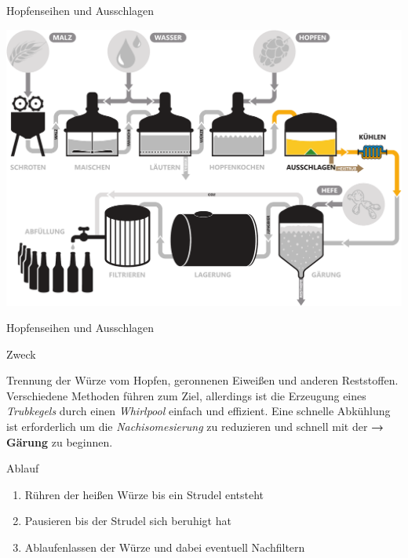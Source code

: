\documentclass[9pt, ngerman]{beamer}
\newcommand{\forward}[1]{\textbf{→\,#1}}
\begin{document}
\begin{frame}{Hopfenseihen und Ausschlagen}
  \begin{center}
    \vspace{0.5cm}
    \includegraphics[width=\textwidth]{pdfs/prozess-ausschlagen.pdf}
  \end{center}
\end{frame}
\begin{frame}{Hopfenseihen und Ausschlagen}
  \begin{block}{Zweck}
    \vspace{0.5em}

    Trennung der Würze vom Hopfen, geronnenen Eiweißen und anderen
    Reststoffen. Verschiedene Methoden führen zum Ziel, allerdings ist die
    Erzeugung eines \emph{Trubkegels} durch einen \emph{Whirlpool} einfach und
    effizient. Eine schnelle Abkühlung ist erforderlich um die
    \emph{Nachisomesierung} zu reduzieren und schnell mit der \forward{Gärung}
    zu beginnen.

  \end{block}

  \begin{block}{Ablauf}
    \begin{enumerate}
      \item Rühren der heißen Würze bis ein Strudel entsteht
      \item Pausieren bis der Strudel sich beruhigt hat
      \item Ablaufenlassen der Würze und dabei eventuell Nachfiltern
    \end{enumerate}
  \end{block}
\end{frame}
\end{document}
